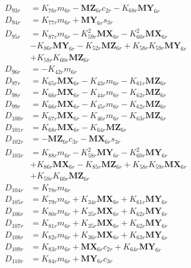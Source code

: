 \begin{align}
D_{93r} &= K_{76r}m_{6r} - \mathbf{MZ}_{6r}c_{2r} - K_{68r}\mathbf{MY}_{6r} \nonumber \\
D_{94r} &= K_{77r}m_{6r} + \mathbf{MY}_{6r}s_{3r} \nonumber \\
D_{95r} &= K_{87r}m_{6r} - K_{59r}^2\mathbf{MX}_{6r} - K_{60r}^2\mathbf{MX}_{6r}  \nonumber \\
&- K_{86r}\mathbf{MY}_{6r} - K_{52r}\mathbf{MZ}_{6r} + K_{58r}K_{59r}\mathbf{MY}_{6r}  \nonumber \\
&+ K_{58r}K_{60r}\mathbf{MZ}_{6r} \nonumber \\
D_{96r} &= -K_{42r}m_{6r} \nonumber \\
D_{97r} &= K_{65r}\mathbf{MX}_{6r} - K_{43r}m_{6r} - K_{61r}\mathbf{MZ}_{6r} \nonumber \\
D_{98r} &= K_{66r}\mathbf{MX}_{6r} - K_{44r}m_{6r} - K_{62r}\mathbf{MZ}_{6r} \nonumber \\
D_{99r} &= K_{66r}\mathbf{MX}_{6r} - K_{45r}m_{6r} - K_{62r}\mathbf{MZ}_{6r} \nonumber \\
D_{100r} &= K_{67r}\mathbf{MX}_{6r} - K_{46r}m_{6r} - K_{63r}\mathbf{MZ}_{6r} \nonumber \\
D_{101r} &= K_{68r}\mathbf{MX}_{6r} - K_{64r}\mathbf{MZ}_{6r} \nonumber \\
D_{102r} &= - \mathbf{MZ}_{6r}c_{3r} - \mathbf{MX}_{6r}s_{3r} \nonumber \\
D_{103r} &= K_{88r}m_{6r} - K_{58r}^2\mathbf{MY}_{6r} - K_{60r}^2\mathbf{MY}_{6r}  \nonumber \\
&+ K_{86r}\mathbf{MX}_{6r} - K_{85r}\mathbf{MZ}_{6r} + K_{58r}K_{59r}\mathbf{MX}_{6r}  \nonumber \\
&+ K_{59r}K_{60r}\mathbf{MZ}_{6r} \nonumber \\
D_{104r} &= K_{78r}m_{6r} \nonumber \\
D_{105r} &= K_{79r}m_{6r} + K_{34r}\mathbf{MX}_{6r} + K_{61r}\mathbf{MY}_{6r} \nonumber \\
D_{106r} &= K_{80r}m_{6r} + K_{35r}\mathbf{MX}_{6r} + K_{62r}\mathbf{MY}_{6r} \nonumber \\
D_{107r} &= K_{81r}m_{6r} + K_{35r}\mathbf{MX}_{6r} + K_{62r}\mathbf{MY}_{6r} \nonumber \\
D_{108r} &= K_{82r}m_{6r} + K_{36r}\mathbf{MX}_{6r} + K_{63r}\mathbf{MY}_{6r} \nonumber \\
D_{109r} &= K_{83r}m_{6r} + \mathbf{MX}_{6r}c_{2r} + K_{64r}\mathbf{MY}_{6r} \nonumber \\
D_{110r} &= K_{84r}m_{6r} + \mathbf{MY}_{6r}c_{3r} \nonumber \\

\end{align}
